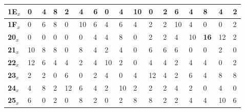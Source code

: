 \begin{longtable}[c]{|l|l|l|l|l|l|l|l|l|l|l|l|l|l|l|l|l|}
\textbf{1E$_x$} & 0              & 4              & 8              & 2              & 4              & 6              & 0              & 4              & 10             & 0              & 2              & 6              & 4              & 8              & 4              & 2              \\ \hline
\textbf{1F$_x$} & 0              & 6              & 8              & 0              & 10             & 6              & 4              & 6              & 4              & 2              & 2              & 10             & 4              & 0              & 0              & 2              \\ \hline
\textbf{20$_x$} & 0              & 0              & 0              & 0              & 0              & 4              & 4              & 8              & 0              & 2              & 2              & 4              & 10             & \textbf{16}             & 12             & 2              \\ \hline
\textbf{21$_x$} & 10             & 8              & 8              & 0              & 8              & 4              & 2              & 4              & 0              & 6              & 6              & 6              & 0              & 0              & 2              & 0              \\ \hline
\textbf{22$_x$} & 12             & 6              & 4              & 4              & 2              & 4              & 10             & 2              & 0              & 4              & 4              & 2              & 4              & 4              & 0              & 2              \\ \hline
\textbf{23$_x$} & 2              & 2              & 0              & 6              & 0              & 2              & 4              & 0              & 4              & 12             & 4              & 2              & 6              & 4              & 8              & 8              \\ \hline
\textbf{24$_x$} & 4              & 8              & 2              & 12             & 6              & 4              & 2              & 10             & 2              & 2              & 2              & 4              & 2              & 0              & 4              & 0              \\ \hline
\textbf{25$_x$} & 6              & 0              & 2              & 0              & 8              & 2              & 0              & 2              & 8              & 8              & 2              & 2              & 4              & 4              & 10             & 6              \\ \hline

\end{longtable}

